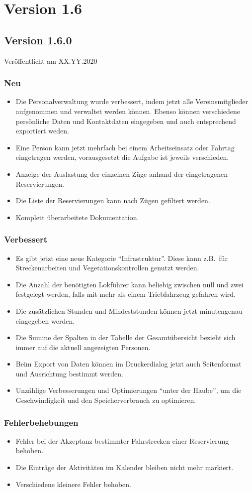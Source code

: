 \section{Version 1.6}\label{version:1:6}
\subsection{Version 1.6.0}
\label{version:1:6:0}
Veröffentlicht am XX.YY.2020
\subsubsection{Neu}
\begin{itemize}
  \item
  Die Personalverwaltung wurde verbessert, indem jetzt alle Vereinsmitglieder aufgenommen und verwaltet werden können.
  Ebenso können verschiedene persönliche Daten und Kontaktdaten eingegeben und auch entsprechend exportiert weden.
  \item
  Eine Person kann jetzt mehrfach bei einem Arbeitseinsatz oder Fahrtag eingetragen werden,
  vorausgesetzt die Aufgabe ist jeweils verschieden.
  \item
  Anzeige der Auslastung der einzelnen Züge anhand der eingetragenen Reservierungen.
  \item
  Die Liste der Reservierungen kann nach Zügen gefiltert werden.
  \item
  Komplett überarbeitete Dokumentation.
\end{itemize}

\subsubsection{Verbessert}
\begin{itemize}
  \item
  Es gibt jetzt eine neue Kategorie "`Infrastruktur"'.
  Diese kann z.B.\ für Streckenarbeiten und Vegetationskontrollen genutzt werden.
  \item
  Die Anzahl der benötigten Lokführer kann beliebig zwischen null und zwei festgelegt werden,
  falls mit mehr als einem Triebfahrzeug gefahren wird.
  \item
  Die zusätzlichen Stunden und Mindeststunden können jetzt minutengenau eingegeben werden.
  \item
  Die Summe der Spalten in der Tabelle der Gesamtübersicht bezieht sich immer auf die aktuell angezeigten Personen.
  \item
  Beim Export von Daten können im Druckerdialog jetzt auch Seitenformat und Ausrichtung bestimmt werden.
  \item
  Unzählige Verbesserungen und Optimierungen "`unter der Haube"', um die Geschwindigkeit und den Speicherverbrauch zu optimieren.
\end{itemize}

\subsubsection{Fehlerbehebungen}
\begin{itemize}
  \item
  Fehler bei der Akzeptanz bestimmter Fahrstrecken einer Reservierung behoben.
  \item
  Die Einträge der Aktivitäten im Kalender bleiben nicht mehr markiert.
  \item
  Verschiedene kleinere Fehler behoben.
\end{itemize}
